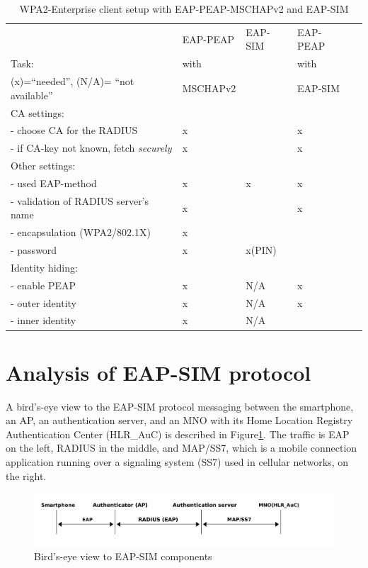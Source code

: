 \documentclass[12pt,a4paper,english]{tutthesis}
\begin{document}
\begin{otherlanguage}{english}
\begin{table}[htb]
\caption{\label{table-peapsim}WPA2-Enterprise client setup with EAP-PEAP-MSCHAPv2 and EAP-SIM}
\centering
\begin{tabular}{|l|l|l|ll|}
\hline
 & EAP-PEAP & EAP-SIM & EAP-PEAP & \\
Task: & with &  & with & \\
(x)=``needed'', (N/A)= ``not available'' & MSCHAPv2 &  & EAP-SIM & \\
\hline
CA settings: &  &  &  & \\
- choose CA for the RADIUS & x &  & x & \\
- if CA-key not known, fetch \emph{securely} & x &  & x & \\
\hline
Other settings: &  &  &  & \\
- used EAP-method & x & x & x & \\
- validation of RADIUS server's name & x &  & x & \\
- encapsulation (WPA2/802.1X) & x &  &  & \\
- password & x & x(PIN) &  & \\
\hline
Identity hiding: &  &  &  & \\
- enable PEAP & x & N/A & x & \\
- outer identity & x & N/A & x & \\
- inner identity & x & N/A &  & \\
\hline
\end{tabular}
\end{table}

\section{Analysis of EAP-SIM protocol}
\label{sec-2-6}
A bird's-eye view to the EAP-SIM protocol messaging between the
smartphone, an AP, an authentication server, and an MNO with its Home Location
Registry Authentication Center (HLR\_AuC) is described in
Figure\ref{fig:eap-sim-bird}.  The traffic is EAP on the left, RADIUS in the
middle, and MAP/SS7, which is a mobile connection application running
over a signaling system (SS7) used in cellular networks, on the right.


\begin{figure}[htb]
\centering
\includegraphics[width=.9\linewidth]{eap-sim-bird.png}
\caption{\label{fig:eap-sim-bird}Bird's-eye view to EAP-SIM components}
\end{figure}






\end{otherlanguage}
\end{document}
